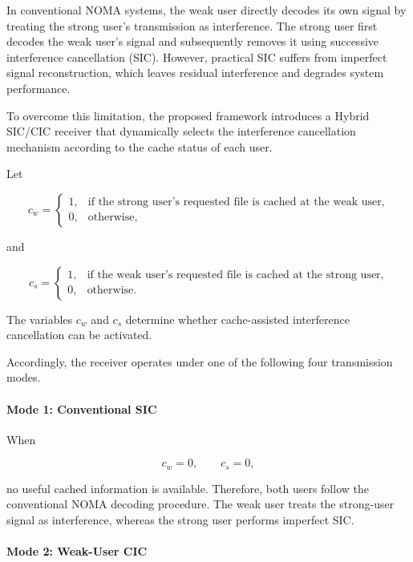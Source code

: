 \documentclass[12pt,a4paper]{article}
\begin{document}
In conventional NOMA systems, the weak user directly decodes its own signal by treating the strong user's transmission as interference. The strong user first decodes the weak user's signal and subsequently removes it using successive interference cancellation (SIC). However, practical SIC suffers from imperfect signal reconstruction, which leaves residual interference and degrades system performance.

To overcome this limitation, the proposed framework introduces a Hybrid SIC/CIC receiver that dynamically selects the interference cancellation mechanism according to the cache status of each user.

Let

\begin{equation}
c_w=
\begin{cases}
1,&\text{if the strong user's requested file is cached at the weak user},\\
0,&\text{otherwise},
\end{cases}
\end{equation}

and

\begin{equation}
c_s=
\begin{cases}
1,&\text{if the weak user's requested file is cached at the strong user},\\
0,&\text{otherwise}.
\end{cases}
\end{equation}

The variables $c_w$ and $c_s$ determine whether cache-assisted interference cancellation can be activated.

Accordingly, the receiver operates under one of the following four transmission modes.

\paragraph*{Mode 1: Conventional SIC}

When

\[
c_w=0,\qquad c_s=0,
\]

no useful cached information is available. Therefore, both users follow the conventional NOMA decoding procedure. The weak user treats the strong-user signal as interference, whereas the strong user performs imperfect SIC.

\paragraph*{Mode 2: Weak-User CIC}
\end{document}
